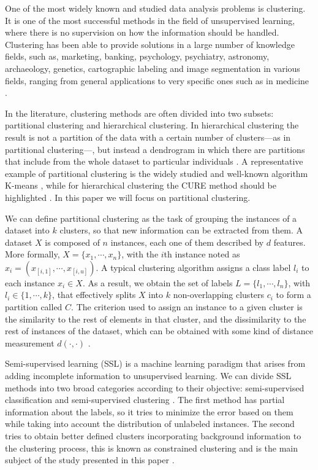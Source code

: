 \documentclass[review]{elsarticle}
\begin{document}
One of the most widely known and studied data analysis problems is clustering. It is one of the most successful methods in the field of unsupervised learning, where there is no supervision on how the information should be handled. Clustering has been able to provide solutions in a large number of knowledge fields, such as, marketing, banking, psychology, psychiatry, astronomy, archaeology, genetics,\cite{Everitt:2009:CA:1538772} cartographic labeling \cite{araujo2019improving} and image segmentation in various fields, ranging from general applications \cite{wang2018non} to very specific ones such as in medicine \cite{verma2016improved, aparajeeta2016modified}.

In the literature, clustering methods are often divided into two subsets: partitional clustering and hierarchical clustering. In hierarchical clustering the result is not a partition of the data with a certain number of clusters---as in partitional clustering---, but instead a dendrogram in which there are partitions that include from the whole dataset to particular individuals \cite{Everitt:2009:CA:1538772}. A representative example of partitional clustering is the widely studied and well-known algorithm K-means \cite{wu2009top}, while for hierarchical clustering the CURE method should be highlighted \cite{guha1998cure}. In this paper we will focus on partitional clustering.

We can define partitional clustering as the task of grouping the instances of a dataset into $k$ clusters, so that new information can be extracted from them. A dataset $X$ is composed of $n$ instances, each one of them described by $d$ features. More formally, $X = \{x_1, \cdots, x_n\}$, with the $i$th instance noted as $x_i = (x_{[i,1]}, \cdots, x_{[i,u]})$. A typical clustering algorithm assigns a class label $l_i$ to each instance $x_i \in X$. As a result, we obtain the set of labels $L = \{l_1, \cdots, l_n\}$, with $l_i \in \{1, \cdots, k\}$, that effectively splits $X$ into $k$ non-overlapping clusters $c_i$ to form a partition called $C$. The criterion used to assign an instance to a given cluster is the similarity to the rest of elements in that cluster, and the dissimilarity to the rest of instances of the dataset, which can be obtained with some kind of distance measurement $d(\cdot, \cdot)$ \cite{jain1999data}.

Semi-supervised learning (SSL) is a machine learning paradigm that arises from adding incomplete information to unsupervised learning. We can divide SSL methods into two broad categories according to their objective: semi-supervised classification and semi-supervised clustering \cite{chapelle2009semi}. The first method has partial information about the labels, so it tries to minimize the error based on them while taking into account the distribution of unlabeled instances. The second tries to obtain better defined clusters incorporating background information to the clustering process, this is known as constrained clustering and is the main subject of the study presented in this paper \cite{triguero2015self}. 
\end{document}
